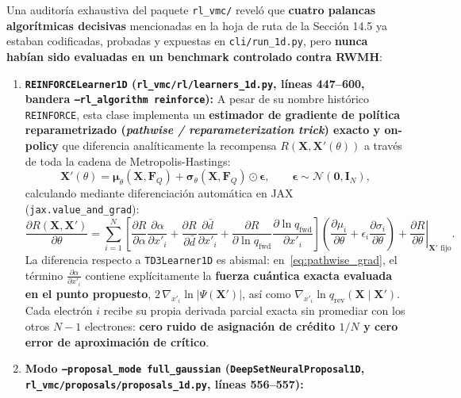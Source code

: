 \documentclass[10pt,a4paper]{article}
\begin{document}
Una auditoría exhaustiva del paquete \texttt{rl\_vmc/} reveló que \textbf{cuatro palancas algorítmicas decisivas} mencionadas en la hoja de ruta de la Sección 14.5 ya estaban codificadas, probadas y expuestas en \texttt{cli/run\_1d.py}, pero \textbf{nunca habían sido evaluadas en un benchmark controlado contra RWMH}:

\begin{enumerate}
\item \textbf{\texttt{REINFORCELearner1D} (\texttt{rl\_vmc/rl/learners\_1d.py}, líneas 447--600, bandera \texttt{--rl\_algorithm reinforce}):}
A pesar de su nombre histórico \texttt{REINFORCE}, esta clase implementa un \textbf{estimador de gradiente de política reparametrizado (\textit{pathwise / reparameterization trick}) exacto y on-policy} que diferencia analíticamente la recompensa $R(\bm{X}, \bm{X}'(\theta))$ a través de toda la cadena de Metropolis-Hastings:
\begin{equation}
\bm{X}'(\theta) = \bm{\mu}_\theta(\bm{X}, \bm{F}_Q) + \bm{\sigma}_\theta(\bm{X}, \bm{F}_Q) \odot \bm{\epsilon}, \qquad \bm{\epsilon} \sim \mathcal{N}(\bm{0}, \bm{I}_N),
\label{eq:reparam}
\end{equation}
calculando mediante diferenciación automática en JAX (\texttt{jax.value\_and\_grad}):
\begin{equation}
\frac{\partial R(\bm{X}, \bm{X}')}{\partial \theta} = \sum_{i=1}^{N} \left[ \frac{\partial R}{\partial \alpha} \frac{\partial \alpha}{\partial x'_i} + \frac{\partial R}{\partial \bar{d}} \frac{\partial \bar{d}}{\partial x'_i} + \frac{\partial R}{\partial \ln q_{\mathrm{fwd}}} \frac{\partial \ln q_{\mathrm{fwd}}}{\partial x'_i} \right] \left(\frac{\partial \mu_i}{\partial \theta} + \epsilon_i \frac{\partial \sigma_i}{\partial \theta}\right) + \left.\frac{\partial R}{\partial \theta}\right|_{\bm{X}'\text{ fijo}}.
\label{eq:pathwise_grad}
\end{equation}
La diferencia respecto a \texttt{TD3Learner1D} es abismal: en~\eqref{eq:pathwise_grad}, el término $\frac{\partial \alpha}{\partial x'_i}$ contiene explícitamente la \textbf{fuerza cuántica exacta evaluada en el punto propuesto}, $2\,\nabla_{x'_i}\ln|\Psi(\bm{X}')|$, así como $\nabla_{x'_i}\ln q_{\mathrm{rev}}(\bm{X}\mid\bm{X}')$. Cada electrón $i$ recibe su propia derivada parcial exacta sin promediar con los otros $N-1$ electrones: \textbf{cero ruido de asignación de crédito $1/N$ y cero error de aproximación de crítico}.
\item \textbf{Modo \texttt{--proposal\_mode full\_gaussian} (\texttt{DeepSetNeuralProposal1D}, \texttt{rl\_vmc/proposals/proposals\_1d.py}, líneas 556--557):}

\end{enumerate}
\end{document}

